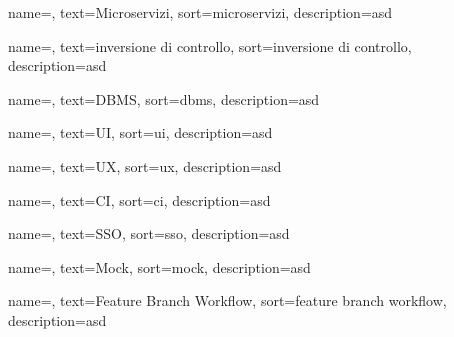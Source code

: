 {
    name=,
    text=Microservizi,
    sort=microservizi,
    description=asd
}

{
    name=,
    text=inversione di controllo,
    sort=inversione di controllo,
    description=asd
}

{
    name=,
    text=DBMS,
    sort=dbms,
    description=asd
}

{
    name=,
    text=UI,
    sort=ui,
    description=asd
}

{
    name=,
    text=UX,
    sort=ux,
    description=asd
}

{
    name=,
    text=CI,
    sort=ci,
    description=asd
}

{
    name=,
    text=SSO,
    sort=sso,
    description=asd
}

{
    name=,
    text=Mock,
    sort=mock,
    description=asd
}

{
    name=,
    text=Feature Branch Workflow,
    sort=feature branch workflow,
    description={asd}
}